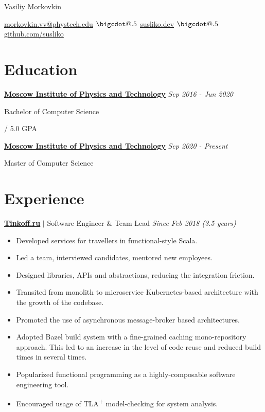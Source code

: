 \documentclass[paper=a4,fontsize=15pt]{scrartcl}
\makeatletter
\newcommand*\bigcdot{\mathpalette\bigcdot@{.5}}
\newcommand*\bigcdot@[2]{\mathbin{\vcenter{\hbox{\scalebox{#2}{$\m@th#1\bullet$}}}}}
\newcommand{\smallspace}{\vspace*{0.1em}}
\newcommand{\quarterspace}{\vspace*{0.25em}}
\newcommand{\halfspace}{\vspace*{0.5em}}
\newcommand{\https}[1]{\href{https://#1}{\ul{#1}}}
\newcommand{\email}[1]{\href{mailto:#1}{\ul{#1}}}
\makeatother
\begin{document}
\begin{center}
  {\fontsize{35}{40}\selectfont Vasiliy Morkovkin \par}
  \halfspace
  \smallspace
  \smallspace

  {\normalsize
    \email{morkovkin.vv@phystech.edu}
    $\bigcdot$ \https{susliko.dev}
    $\bigcdot$ \https{github.com/susliko}
    \par}
\end{center}

\section*{Education}{}
\noindent \href{https://mipt.ru/english/}{\textbf{\ul{Moscow Institute of Physics and Technology}}}
{\hfill \footnotesize \textit{Sep 2016 - Jun 2020}} \par
\noindent Bachelor of Computer Science \par
\quarterspace
\footnotesize
{} / 5.0 GPA

\noindent \href{https://mipt.ru/english/}{\textbf{\ul{Moscow Institute of Physics and Technology}}}
{\hfill \footnotesize \textit{Sep 2020 - Present}} \par
\noindent Master of Computer Science \par
\quarterspace
\footnotesize

\section*{Experience}{}
\normalsize
\noindent \href{https://www.tinkoff.ru}{\textbf{\ul{Tinkoff.ru}}}
$\vert$ \small Software Engineer \& Team Lead
{\hfill \footnotesize \textit{Since Feb 2018 (3.5 years)}}
\begin{itemize}[noitemsep,leftmargin=20pt,label=\raisebox{0.25ex}{\tiny$\bullet$},topsep=5pt]
  \small
  \item Developed services for travellers in functional-style Scala.
  \item Led a team, interviewed candidates, mentored new employees.
  \item Designed libraries, APIs and abstractions, reducing the integration friction.
  \item Transited from monolith to microservice Kubernetes-based architecture with the growth of the codebase.
  \item Promoted the use of asynchronous message-broker based architectures.
  \item Adopted Bazel build system with a fine-grained caching mono-repository approach. This led to an increase in the level of code reuse and reduced build times in several times.
  \item Popularized functional programming as a highly-composable software engineering tool.
  \item Encouraged usage of TLA\textsuperscript{+} model-checking for system analysis.
\end{itemize}
\end{document}
